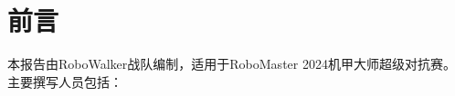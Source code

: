 \section*{前言}

    
    \noindent
    本报告由RoboWalker战队编制，适用于RoboMaster 2024机甲大师超级对抗赛。主要撰写人员包括：
    
    \noindent
